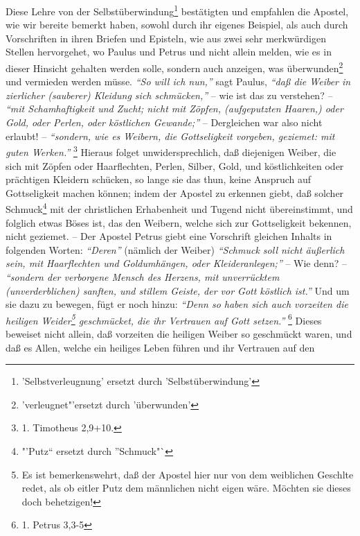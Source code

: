 Diese Lehre von der Selbstüberwindung\footnote{'Selbstverleugnung' ersetzt durch 'Selbstüberwindung'} bestätigten und empfahlen die Apostel, wie
wir bereite bemerkt haben, sowohl durch ihr eigenes Beispiel, als auch durch
Vorschriften in ihren Briefen und Episteln, wie aus zwei sehr merkwürdigen
Stellen hervorgehet, wo Paulus und Petrus und nicht allein melden, wie es in
dieser Hinsicht gehalten werden solle, sondern auch anzeigen, was überwunden\footnote{'verleugnet"'ersetzt durch 'überwunden'} und
vermieden werden müsse. \textit{"`So will ich nun,"'} sagt Paulus,
\textit{"`daß die Weiber in
zierlicher (sauberer) Kleidung sich schmücken,"'} -- wie ist das zu verstehen? --
\textit{"`mit Schamhaftigkeit und Zucht; nicht mit Zöpfen, (aufgeputzten Haaren,) oder
Gold, oder Perlen, oder köstlichen Gewande;"'} -- Dergleichen war also nicht
erlaubt! -- \textit{"`sondern, wie es Weibern, die Gottseligkeit vorgeben, geziemet: mit
guten Werken."'}
\footnote{1. Timotheus 2,9+10.}
Hieraus folget unwidersprechlich, daß
diejenigen Weiber, die sich mit Zöpfen oder Haarflechten, Perlen, Silber, Gold,
und köstlichkeiten oder prächtigen Kleidern schücken, so lange sie das thun,
keine Anspruch auf Gottseligkeit machen können; indem der Apostel zu erkennen
giebt, daß solcher Schmuck\footnote{"'Putz"` ersetzt durch "'Schmuck"`} mit der christlichen Erhabenheit und Tugend nicht
übereinstimmt, und folglich etwas Böses ist, das den Weibern, welche sich zur
Gottseligkeit bekennen, nicht geziemet. -- Der Apostel Petrus giebt eine
Vorschrift gleichen Inhalts in folgenden Worten: \textit{"`Deren"'} (nämlich der Weiber)
\textit{"`Schmuck soll nicht äußerlich sein, mit Haarflechten und Goldumhängen, oder
Kleideranlegen;"'} -- Wie denn? --
\textit{"`sondern der verborgene Mensch des Herzens,
mit unverrücktem (unverderblichen) sanften, und stillem Geiste, der vor Gott
köstlich ist."'} Und um sie dazu zu bewegen, fügt er noch hinzu:
\textit{"`Denn so haben
sich auch vorzeiten die heiligen Weider\footnote{Es ist bemerkenswehrt, daß der
Apostel hier nur von dem weiblichen Geschlte redet, als ob eitler Putz dem
männlichen nicht eigen wäre. Möchten sie dieses doch behetzigen!} geschmücket,
die ihr Vertrauen auf Gott setzen."'}
\footnote{1. Petrus 3,3-5}
Dieses
beweiset nicht allein, daß vorzeiten die heiligen Weiber so geschmückt waren,
und daß es Allen, welche ein heiliges Leben führen und ihr Vertrauen auf den
